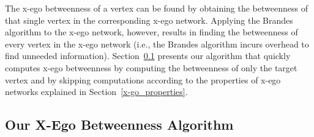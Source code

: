 The x-ego betweenness of a vertex can be found by obtaining the betweenness of that single vertex in the corresponding x-ego network.
Applying the Brandes algorithm to the x-ego network, however, results in finding the betweenness of every vertex in the x-ego network (i.e., the Brandes algorithm incurs overhead to find unneeded information).
Section~\ref{algorithm} presents our algorithm that quickly computes x-ego betweenness by computing the betweenness of only the target vertex and by skipping computations according to the properties of x-ego networks explained in Section~\ref{x-go_properties}.

\subsection{Our X-Ego Betweenness Algorithm}\label{algorithm}

